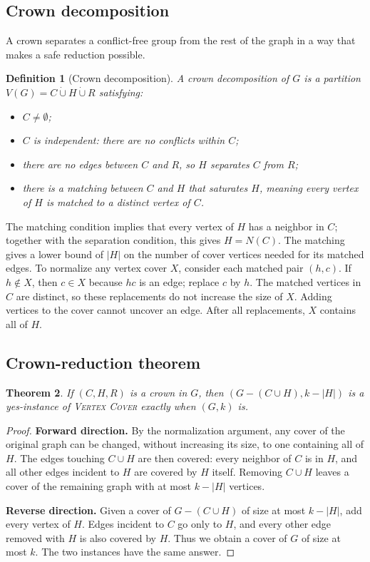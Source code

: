 \documentclass[11pt]{article}
\newtheorem{theorem}{Theorem}[section]
\newtheorem{definition}[theorem]{Definition}
\newcommand{\VC}{\textsc{Vertex Cover}}
\begin{document}
\subsection{Crown decomposition}

A crown separates a conflict-free group from the rest of the graph in a way that makes a safe reduction possible.

\begin{definition}[Crown decomposition]
A crown decomposition of $G$ is a partition $V(G)=C\mathbin{\dot\cup}H\mathbin{\dot\cup}R$ satisfying:
\begin{itemize}
  \item $C\neq\emptyset$;
  \item $C$ is independent: there are no conflicts within $C$;
  \item there are no edges between $C$ and $R$, so $H$ separates $C$ from $R$;
  \item there is a matching between $C$ and $H$ that saturates $H$, meaning every vertex of $H$ is matched to a distinct vertex of $C$.
\end{itemize}
\end{definition}

The matching condition implies that every vertex of $H$ has a neighbor in $C$; together with the separation condition, this gives $H=N(C)$. The matching gives a lower bound of $|H|$ on the number of cover vertices needed for its matched edges. To normalize any vertex cover $X$, consider each matched pair $(h,c)$. If $h\notin X$, then $c\in X$ because $hc$ is an edge; replace $c$ by $h$. The matched vertices in $C$ are distinct, so these replacements do not increase the size of $X$. Adding vertices to the cover cannot uncover an edge. After all replacements, $X$ contains all of $H$.

\subsection{Crown-reduction theorem}

\begin{theorem}
If $(C,H,R)$ is a crown in $G$, then $(G-(C\cup H),k-|H|)$ is a yes-instance of \VC{} exactly when $(G,k)$ is.
\end{theorem}
\begin{proof}
\textbf{Forward direction.} By the normalization argument, any cover of the original graph can be changed, without increasing its size, to one containing all of $H$. The edges touching $C\cup H$ are then covered: every neighbor of $C$ is in $H$, and all other edges incident to $H$ are covered by $H$ itself. Removing $C\cup H$ leaves a cover of the remaining graph with at most $k-|H|$ vertices.

\textbf{Reverse direction.} Given a cover of $G-(C\cup H)$ of size at most $k-|H|$, add every vertex of $H$. Edges incident to $C$ go only to $H$, and every other edge removed with $H$ is also covered by $H$. Thus we obtain a cover of $G$ of size at most $k$. The two instances have the same answer.
\end{proof}
\end{document}
